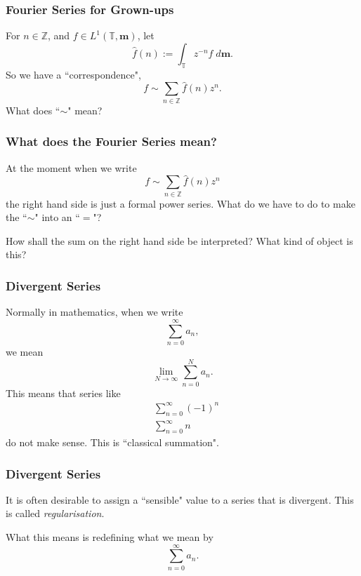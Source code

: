 \documentclass{beamer}
\newcommand{\Circ}{\mathbb{T}}
\newcommand{\Itgr}{\mathbb{Z}}
\newcommand{\ha}{\boldsymbol{m}}
\begin{document}
\begin{frame}
    \frametitle{Fourier Series for Grown-ups}
    For $n \in \Itgr$, and $f \in L^1(\Circ,\ha)$,
    let
    \begin{equation*}
        \widehat{f}(n) := \int_\Circ z^{-n}f\;d\ha.
    \end{equation*}
    So we have a ``correspondence",
    \begin{equation*}
        f \sim \sum_{n \in \Itgr} \widehat{f}(n) z^n.        
    \end{equation*}
    What does ``$\sim$" mean?
\end{frame}

\begin{frame}
    \frametitle{What does the Fourier Series mean?}
    At the moment when we write
    \begin{equation*}
        f \sim \sum_{n \in \Itgr} \widehat{f}(n) z^n
    \end{equation*}
    the right hand side is just a formal power series. What do
    we have to do to make the ``$\sim$" into an ``$=$"?
    
    How shall the sum on the right hand side be interpreted? What
    kind of object is this?
\end{frame}

\begin{frame}
    \frametitle{Divergent Series}
    Normally in mathematics, when we write
    \begin{equation*}
        \sum_{n=0}^\infty a_n,
    \end{equation*}
    we mean
    \begin{equation*}
        \lim_{N\rightarrow\infty}\sum_{n=0}^N a_n.
    \end{equation*}
    This means that series like
    \begin{align*}
        &\sum_{n=0}^\infty (-1)^n\\
        &\sum_{n=0}^\infty n
    \end{align*}
    do not make sense. This is ``classical summation".
\end{frame}

\begin{frame}
    \frametitle{Divergent Series}
    It is often desirable to assign a ``sensible" value
    to a series that is divergent. This is called \emph{regularisation}.
    
    
    What this means is redefining what we mean by
    \begin{equation*}
        \sum_{n=0}^\infty a_n.
    \end{equation*}
\end{frame}
\end{document}
